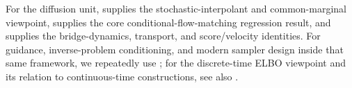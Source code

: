 For the diffusion unit, \citet[Def.~1 and \S2]{albergo_boffi_vanden_eijnden_2025_stochastic_interpolants} supplies the stochastic-interpolant and common-marginal viewpoint, \citet[Thm.~2 and \S\S3.1--4]{lipman_chen_ben_hamu_nickel_le_2023_flow_matching} supplies the core conditional-flow-matching regression result, and \citet[Thms.~11--12, 17 and \S4.1]{holderrieth_erives_2026_intro_flow_matching} supplies the bridge-dynamics, transport, and score/velocity identities.
For guidance, inverse-problem conditioning, and modern sampler design inside that same framework, we repeatedly use \citet[\S\S8.1--8.4 and \S9.2.4]{lai_song_kim_mitsufuji_ermon_2025_principles_diffusion}; for the discrete-time ELBO viewpoint and its relation to continuous-time constructions, see also \citet[\S3.5, eqs.~(11)--(12)]{kingma_salimans_poole_ho_2021_variational_diffusion}.
